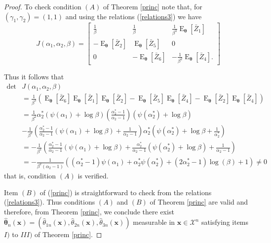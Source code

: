 \documentclass[10pt,a4paper,onecolumn]{article} %
\newcommand{\bs}{\boldsymbol}
\newcommand{\on}{\operatorname}
\begin{document}
\begin{proof}
To check condition $(A)$ of Theorem \ref{princ} note that, for $(\gamma_1,\gamma_2)=(1,1)$ and using the relations (\ref{relations3}) we have
\begin{equation}\label{mfishergg2}
J(\alpha_1,\alpha_2,\beta)=
\begin{bmatrix}
 \frac{1}{\beta}  & \frac{1}{\beta} &  \frac{1}{\beta^3}\on{E}_{\bs{\theta}}\left[\bar{Z}_1\right]\\
 -\on{E}_{\bs{\theta}}\left[\bar{Z}_2\right] &  \on{E}_{\bs{\theta}}\left[\bar{Z}_5\right] & 0\\
 0 & - \on{E}_{\bs{\theta}}\left[\bar{Z}_6\right] & - \frac{1}{\beta^2} \on{E}_{\bs{\theta}}\left[\bar{Z}_4\right].
\end{bmatrix}
\end{equation}

Thus it follows that
\begin{equation*}
\begin{aligned}
 \on{det} & J(\alpha_1,\alpha_2,\beta) \\ &= \frac{1}{\beta^3}\left(\on{E}_{\bs{\theta}}\left[\bar{Z}_6\right]\on{E}_{\bs{\theta}}\left[\bar{Z}_1\right]\on{E}_{\bs{\theta}}\left[\bar{Z}_2\right] - \on{E}_{\bs{\theta}}\left[\bar{Z}_5\right]\on{E}_{\bs{\theta}}\left[\bar{Z}_4\right] - \on{E}_{\bs{\theta}}\left[\bar{Z}_2\right]\on{E}_{\bs{\theta}}\left[\bar{Z}_4\right]\right)\\
&= \frac{1}{\beta^2} \alpha_2^*(\psi(\alpha_1)+\log\beta) \left(\frac{\alpha_2^*-1}{\alpha_2 - 1}\right)(\psi(\alpha_2^*) + \log \beta)\\
& - \frac{1}{\beta^2}\left(\frac{\alpha_2^*-1}{\alpha_2-1}(\psi(\alpha_1)+\log \beta)+\frac{1}{\alpha_2-1} \right)\alpha_2^*\left(\psi(\alpha_2^*) + \log \beta + \frac{1}{\alpha_2^*}\right)
\\
& = -\frac{1}{\beta^2}\left(\frac{\alpha_2^*-1}{\alpha_2-1}(\psi(\alpha_1)+\log\beta) + \frac{\alpha_2^*}{\alpha_2-1}\left(\psi(\alpha_2^*)+\log \beta\right) + \frac{1}{\alpha_2-1}\right)\\
& =-\frac{1}{\beta^2(\alpha_2-1)}\left((\alpha_2^*-1)\psi(\alpha_1) + \alpha_2^*\psi(\alpha_2^*) + (2\alpha_2^*-1)\log(\beta) + 1\right)\neq 0
\end{aligned}
\end{equation*}
that is, condition $(A)$ is verified. 

Item $(B)$ of (\ref{princ}) is straightforward to check from the relations (\ref{relations3}). Thus conditions $(A)$ and $(B)$ of Theorem \ref{princ} are valid and therefore, from Theorem \ref{princ}, we conclude there exist $\bs{\hat{\theta}}_n(\bs{x})=(\hat{\theta}_{1n}(\bs{x}),\hat{\theta}_{2n}(\bs{x}),\hat{\theta}_{3n}(\bs{x}))$ measurable in $\bs{x}\in \mathcal{X}^n$ satisfying items $I)$ to $III)$ of Theorem \ref{princ}.


\end{proof}
\end{document}
